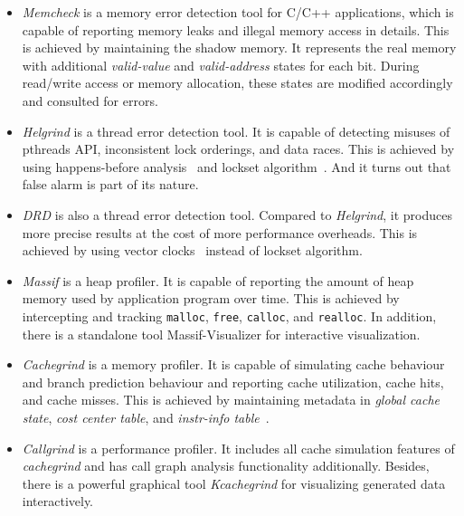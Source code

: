\begin{itemize}
    \item \textit{Memcheck} is a memory error detection tool for C/C++ applications, which is capable of reporting memory leaks and illegal memory access in details. This is achieved by maintaining the shadow memory. It represents the real memory with additional \textit{valid-value} and \textit{valid-address} states for each bit. During read/write access or memory allocation, these states are modified accordingly and consulted for errors.
    
    \item \textit{Helgrind} is a thread error detection tool. It is capable of detecting misuses of pthreads API, inconsistent lock orderings, and data races. This is achieved by using happens-before analysis~\cite{happens-before-relation} and lockset algorithm~\cite{lockset-algorithm}. And it turns out that false alarm is part of its nature.
    
    \item \textit{DRD} is also a thread error detection tool. Compared to \textit{Helgrind}, it produces more precise results at the cost of more performance overheads. This is achieved by using vector clocks~\cite{vector-clocks} instead of lockset algorithm.
    
    \item \textit{Massif} is a heap profiler. It is capable of reporting the amount of heap memory used by application program over time. This is achieved by intercepting and tracking \texttt{malloc}, \texttt{free}, \texttt{calloc}, and \texttt{realloc}. In addition, there is a standalone tool Massif-Visualizer for interactive visualization.
    
    \item \textit{Cachegrind} is a memory profiler. It is capable of simulating cache behaviour and branch prediction behaviour and reporting cache utilization, cache hits, and cache misses. This is achieved by maintaining metadata in \textit{global cache state}, \textit{cost center table}, and \textit{instr-info table}~\cite{cachegrind}.
    
    \item \textit{Callgrind} is a performance profiler. It includes all cache simulation features of \textit{cachegrind} and has call graph analysis functionality additionally. Besides, there is a powerful graphical tool \textit{Kcachegrind} for visualizing generated data interactively.
    
\end{itemize}

